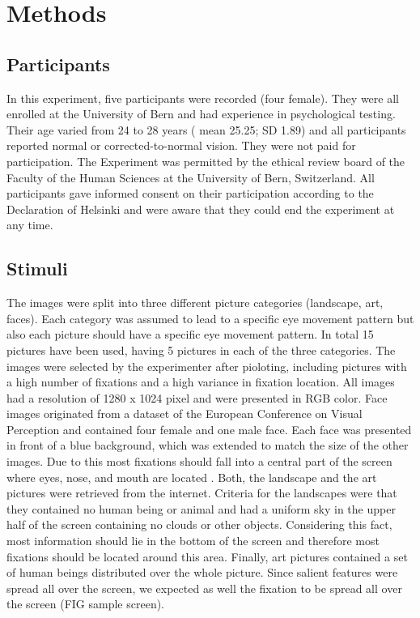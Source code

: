 \documentclass[a4paper,man,natbib,floatsintext]{apa6}
\begin{document}
\section{Methods}

\subsection{Participants}
In this experiment, five participants were recorded (four female). They were all enrolled at the University of Bern and had experience in psychological testing. Their age varied from 24 to 28 years ( mean 25.25; SD 1.89) and all participants reported normal or corrected-to-normal vision. They were not paid for participation. The Experiment was permitted by the ethical review board of the Faculty of the Human Sciences at the University of Bern, Switzerland. All participants gave informed consent on their participation according to the Declaration of Helsinki and were aware that they could end the experiment at any time.\\

\subsection{Stimuli} 
The images were split into three different picture categories (landscape, art, faces). Each category was assumed to lead to a specific eye movement pattern \citep{Anderson2013, Henderson2003} but also each picture should have a specific eye movement pattern. In total 15 pictures have been used, having 5 pictures in each of the three categories. The images were selected by the experimenter after pioloting, including pictures with a high number of fixations and a high variance in fixation location. All images had a resolution of 1280 x 1024 pixel and were presented in RGB color. Face images originated from a dataset of the European Conference on Visual Perception \citep{Hancock} and contained four female and one male face. Each face was presented in front of a blue background, which was extended to match the size of the other images. Due to this most fixations should fall into a central part of the screen where eyes, nose, and mouth are located \citep{Hernandez2009}. Both, the landscape and the art pictures were retrieved from the internet. Criteria for the landscapes were that they contained no human being or animal and had a uniform sky in the upper half of the screen containing no clouds or other objects. Considering this fact, most information should lie in the bottom of the screen and therefore most fixations should be located around this area. Finally, art pictures contained a set of human beings distributed over the whole picture. Since salient features were spread all over the screen, we expected as well the fixation to be spread all over the screen (FIG sample screen). \\
\end{document}
